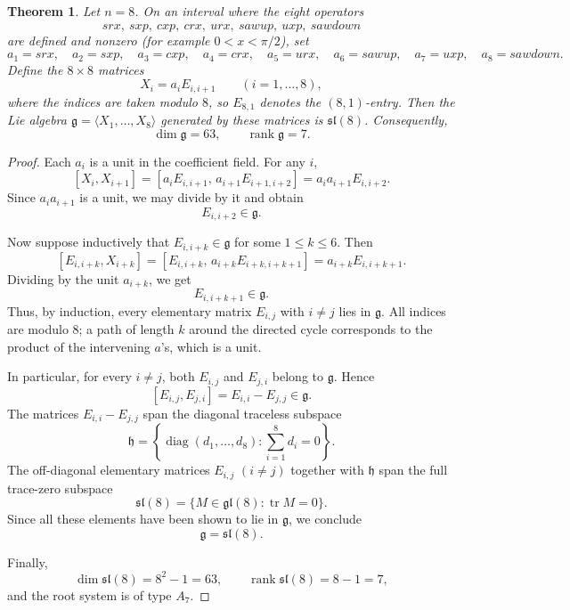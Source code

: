 \documentclass{article}
\newtheorem{theorem}{Theorem}
\begin{document}
\begin{theorem}
Let \(n=8\). On an interval where the eight operators
\[
srx,\ sxp,\ cxp,\ crx,\ urx,\ sawup,\ uxp,\ sawdown
\]
are defined and nonzero (for example \(0<x<\pi/2\)), set
\[
a_1=srx,\quad a_2=sxp,\quad a_3=cxp,\quad a_4=crx,\quad
a_5=urx,\quad a_6=sawup,\quad a_7=uxp,\quad a_8=sawdown.
\]
Define the \(8\times 8\) matrices
\[
X_i=a_i E_{i,i+1}\qquad (i=1,\dots,8),
\]
where the indices are taken modulo \(8\), so \(E_{8,1}\) denotes the \((8,1)\)-entry. Then the Lie algebra \(\mathfrak{g}=\langle X_1,\dots,X_8\rangle\) generated by these matrices is \(\mathfrak{sl}(8)\). Consequently,
\[
\dim\mathfrak{g}=63,\qquad \operatorname{rank}\mathfrak{g}=7.
\]
\end{theorem}

\begin{proof}
Each \(a_i\) is a unit in the coefficient field. For any \(i\),
\[
[X_i,X_{i+1}]
=[a_iE_{i,i+1},\,a_{i+1}E_{i+1,i+2}]
=a_i a_{i+1}E_{i,i+2}.
\]
Since \(a_i a_{i+1}\) is a unit, we may divide by it and obtain
\[
E_{i,i+2}\in\mathfrak{g}.
\]

Now suppose inductively that \(E_{i,i+k}\in\mathfrak{g}\) for some \(1\le k\le 6\). Then
\[
[E_{i,i+k},X_{i+k}]
=[E_{i,i+k},\,a_{i+k}E_{i+k,i+k+1}]
=a_{i+k}E_{i,i+k+1}.
\]
Dividing by the unit \(a_{i+k}\), we get
\[
E_{i,i+k+1}\in\mathfrak{g}.
\]
Thus, by induction, every elementary matrix \(E_{i,j}\) with \(i\ne j\) lies in \(\mathfrak{g}\). All indices are modulo \(8\); a path of length \(k\) around the directed cycle corresponds to the product of the intervening \(a\)'s, which is a unit.

In particular, for every \(i\ne j\), both \(E_{i,j}\) and \(E_{j,i}\) belong to \(\mathfrak{g}\). Hence
\[
[E_{i,j},E_{j,i}]=E_{i,i}-E_{j,j}\in\mathfrak{g}.
\]
The matrices \(E_{i,i}-E_{j,j}\) span the diagonal traceless subspace
\[
\mathfrak{h}=\left\{\operatorname{diag}(d_1,\dots,d_8):\sum_{i=1}^8 d_i=0\right\}.
\]
The off-diagonal elementary matrices \(E_{i,j}\) \((i\ne j)\) together with \(\mathfrak{h}\) span the full trace-zero subspace
\[
\mathfrak{sl}(8)=\{M\in\mathfrak{gl}(8):\operatorname{tr}M=0\}.
\]
Since all these elements have been shown to lie in \(\mathfrak{g}\), we conclude
\[
\mathfrak{g}=\mathfrak{sl}(8).
\]

Finally,
\[
\dim\mathfrak{sl}(8)=8^2-1=63,\qquad
\operatorname{rank}\mathfrak{sl}(8)=8-1=7,
\]
and the root system is of type \(A_7\).
\end{proof}
\end{document}
